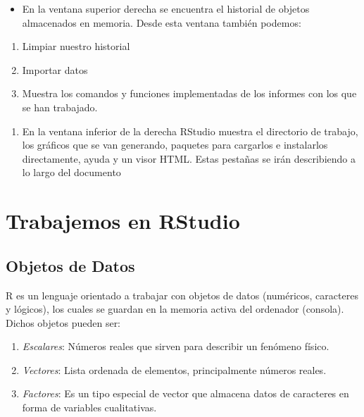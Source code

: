 \documentclass[]{book}
\providecommand{\tightlist}{%
  \setlength{\itemsep}{0pt}\setlength{\parskip}{0pt}}
\begin{document}
\begin{itemize}
\tightlist
\item
  En la ventana superior derecha se encuentra el historial de objetos almacenados en memoria. Desde esta ventana también podemos:\\
\end{itemize}

\begin{enumerate}
\def\labelenumi{\alph{enumi})}
\tightlist
\item
  Limpiar nuestro historial\\
\item
  Importar datos\\
\item
  Muestra los comandos y funciones implementadas de los informes con los que se han trabajado.
\end{enumerate}

\begin{enumerate}
\def\labelenumi{\arabic{enumi}.}
\setcounter{enumi}{2}
\tightlist
\item
  En la ventana inferior de la derecha RStudio muestra el directorio de trabajo, los gráficos que se van generando, paquetes para cargarlos e instalarlos directamente, ayuda y un visor HTML. Estas pestañas se irán describiendo a lo largo del documento
\end{enumerate}

\hypertarget{trabajemos-en-rstudio}{%
\section{Trabajemos en RStudio}\label{trabajemos-en-rstudio}}

\hypertarget{objetos-de-datos}{%
\subsection{Objetos de Datos}\label{objetos-de-datos}}

R es un lenguaje orientado a trabajar con objetos de datos (numéricos, caracteres y lógicos), los cuales se guardan en la memoria activa del ordenador (consola). Dichos objetos pueden ser:

\begin{enumerate}
\def\labelenumi{\arabic{enumi}.}
\tightlist
\item
  \emph{Escalares}: Números reales que sirven para describir un fenómeno físico.
\item
  \emph{Vectores}: Lista ordenada de elementos, principalmente números reales.
\item
  \emph{Factores}: Es un tipo especial de vector que almacena datos de caracteres en forma de variables cualitativas.
\end{enumerate}
\end{document}
